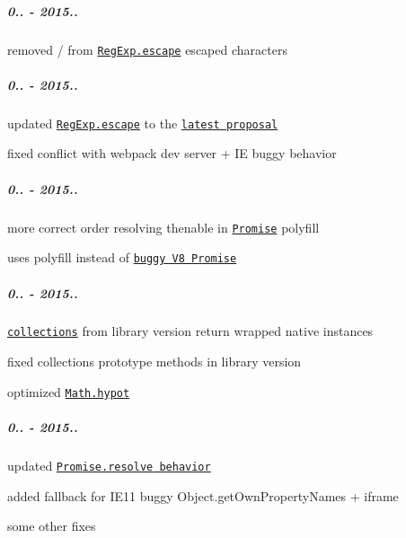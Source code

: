 \subparagraph*{0.. -\/ 2015..}


\begin{DoxyItemize}
\item removed {\ttfamily /} from \href{https://github.com/zloirock/core-js/#ecmascript-7-proposals}{\tt {\ttfamily Reg\+Exp.\+escape}} escaped characters
\end{DoxyItemize}

\subparagraph*{0.. -\/ 2015..}


\begin{DoxyItemize}
\item updated \href{https://github.com/zloirock/core-js/#ecmascript-7-proposals}{\tt {\ttfamily Reg\+Exp.\+escape}} to the \href{https://github.com/benjamingr/RexExp.escape}{\tt latest proposal}
\item fixed conflict with webpack dev server + IE buggy behavior
\end{DoxyItemize}

\subparagraph*{0.. -\/ 2015..}


\begin{DoxyItemize}
\item more correct order resolving thenable in \href{https://github.com/zloirock/core-js/#ecmascript-6-promise}{\tt {\ttfamily Promise}} polyfill
\item uses polyfill instead of \href{https://github.com/zloirock/core-js/issues/78}{\tt buggy V8 {\ttfamily Promise}}
\end{DoxyItemize}

\subparagraph*{0.. -\/ 2015..}


\begin{DoxyItemize}
\item \href{https://github.com/zloirock/core-js/#ecmascript-6-collections}{\tt collections} from {\ttfamily library} version return wrapped native instances
\item fixed collections prototype methods in {\ttfamily library} version
\item optimized \href{https://github.com/zloirock/core-js/#ecmascript-6-math}{\tt {\ttfamily Math.\+hypot}}
\end{DoxyItemize}

\subparagraph*{0.. -\/ 2015..}


\begin{DoxyItemize}
\item updated \href{https://esdiscuss.org/topic/fixing-promise-resolve}{\tt {\ttfamily Promise.\+resolve} behavior}
\item added fallback for I\+E11 buggy {\ttfamily Object.\+get\+Own\+Property\+Names} + iframe
\item some other fixes
\end{DoxyItemize}


